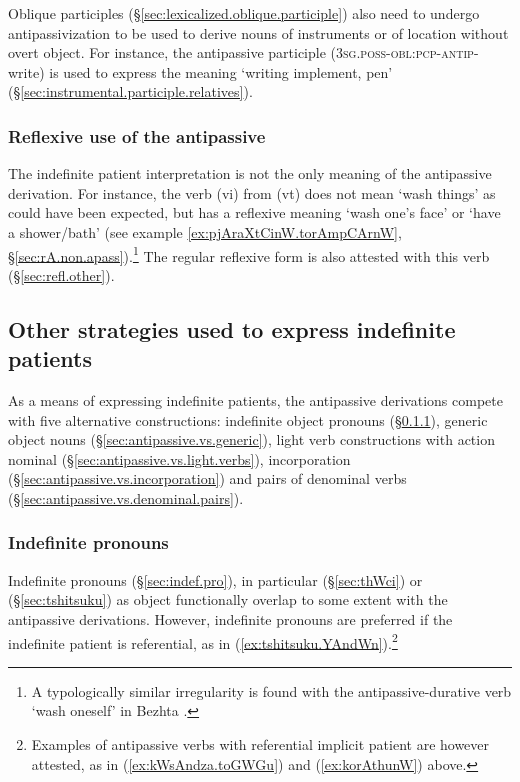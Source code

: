 Oblique participles (§\ref {sec:lexicalized.oblique.participle}) also need to undergo antipassivization to be used to derive nouns of instruments or of location without overt object. For instance, the antipassive participle  (\textsc{3sg}.\textsc{poss}-\textsc{obl}:\textsc{pcp}-\textsc{antip}-write) is used to express the meaning `writing implement, pen' (§\ref {sec:instrumental.participle.relatives}).
 

   \subsubsection{Reflexive use of the antipassive  } \label{sec:antipassive.reflexive}
The indefinite patient interpretation is not the only meaning of the  antipassive derivation. For instance, the verb  (vi) from  (vt) does not mean `wash things' as could have been expected, but has a reflexive meaning `wash one's face' or `have a shower/bath' (see example \ref{ex:pjAraXtCinW.torAmpCArnW}, §\ref{sec:rA.non.apass}).\footnote{A typologically similar irregularity is found with the antipassive-durative verb  `wash oneself' in Bezhta 
\citep[554]{khalilova16bezhta.valency}. } The regular reflexive form  is also attested with this verb (§\ref{sec:refl.other}).

  \subsection{Other strategies used to express indefinite patients } \label{sec:non.antipassive.indef.patient}
As a means of expressing indefinite patients, the antipassive derivations compete with five alternative constructions: indefinite  object pronouns (§\ref{sec:antipassive.vs.indef.pronouns}), generic object nouns (§\ref{sec:antipassive.vs.generic}), light verb constructions with action nominal (§\ref{sec:antipassive.vs.light.verbs}), incorporation (§\ref{sec:antipassive.vs.incorporation}) and pairs of denominal verbs (§\ref{sec:antipassive.vs.denominal.pairs}).  

\subsubsection{Indefinite pronouns } \label{sec:antipassive.vs.indef.pronouns}
Indefinite pronouns (§\ref{sec:indef.pro}), in particular  (§\ref{sec:thWci}) or   (§\ref{sec:tshitsuku}) as object functionally overlap to some extent with the  antipassive derivations. However, indefinite pronouns are preferred if the indefinite patient is referential, as in (\ref{ex:tshitsuku.YAndWn}).\footnote{Examples of antipassive verbs with referential implicit patient are however attested, as in (\ref{ex:kWsAndza.toGWGu}) and (\ref{ex:korAthunW}) above. }

